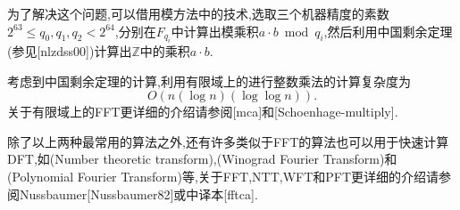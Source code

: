 \documentclass{ctexart}
\newcommand\mtcasCite[1]{[#1]}
\begin{document}
为了解决这个问题,可以借用模方法中的技术,选取三个机器精度的素数$2^{63}\le q_0,q_1,q_2<2^{64}$,分别在$F_{q_i}$中计算出模乘积$a\cdot b\bmod q_i$,然后利用中国剩余定理(参见\mtcasCite{nlzdss00})计算出$\mathbb{Z}$中的乘积$a\cdot b$.

考虑到中国剩余定理的计算,利用有限域上的进行整数乘法的计算复杂度为$$O(n(\log{n})(\log{\log{n}})).$$关于有限域上的FFT更详细的介绍请参阅\mtcasCite{mca}和\mtcasCite{Schoenhage-multiply}.

除了以上两种最常用的算法之外,还有许多类似于FFT的算法也可以用于快速计算DFT,如(Number theoretic transform),(Winograd Fourier Transform)和(Polynomial Fourier Transform)等,关于FFT,NTT,WFT和PFT更详细的介绍请参阅Nussbaumer\mtcasCite{Nussbaumer82}或中译本\mtcasCite{fftca}.


\printindex
\end{document}

